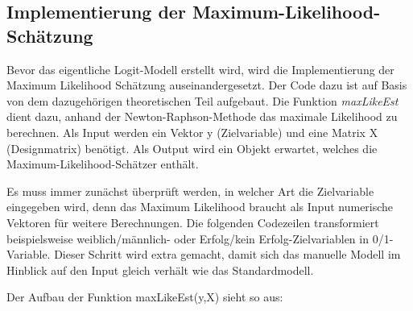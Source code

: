 \documentclass[12pt,]{article}
\newenvironment{Shaded}{\begin{snugshade}}{\end{snugshade}}
\newcommand{\KeywordTok}[1]{\textcolor[rgb]{0.13,0.29,0.53}{\textbf{#1}}}
\newcommand{\DataTypeTok}[1]{\textcolor[rgb]{0.13,0.29,0.53}{#1}}
\newcommand{\DecValTok}[1]{\textcolor[rgb]{0.00,0.00,0.81}{#1}}
\newcommand{\StringTok}[1]{\textcolor[rgb]{0.31,0.60,0.02}{#1}}
\newcommand{\CommentTok}[1]{\textcolor[rgb]{0.56,0.35,0.01}{\textit{#1}}}
\newcommand{\ControlFlowTok}[1]{\textcolor[rgb]{0.13,0.29,0.53}{\textbf{#1}}}
\newcommand{\OperatorTok}[1]{\textcolor[rgb]{0.81,0.36,0.00}{\textbf{#1}}}
\newcommand{\NormalTok}[1]{#1}
\begin{document}
\subsection{Implementierung der
Maximum-Likelihood-Schätzung}\label{implementierung-der-maximum-likelihood-schatzung}

Bevor das eigentliche Logit-Modell erstellt wird, wird die
Implementierung der Maximum Likelihood Schätzung auseinandergesetzt. Der
Code dazu ist auf Basis von dem dazugehörigen theoretischen Teil
aufgebaut. Die Funktion \emph{maxLikeEst} dient dazu, anhand der
Newton-Raphson-Methode das maximale Likelihood zu berechnen. Als Input
werden ein Vektor y (Zielvariable) und eine Matrix X (Designmatrix)
benötigt. Als Output wird ein Objekt erwartet, welches die
Maximum-Likelihood-Schätzer enthält.

Es muss immer zunächst überprüft werden, in welcher Art die Zielvariable
eingegeben wird, denn das Maximum Likelihood braucht als Input
numerische Vektoren für weitere Berechnungen. Die folgenden Codezeilen
transformiert beispielsweise weiblich/männlich- oder Erfolg/kein
Erfolg-Zielvariablen in 0/1-Variable. Dieser Schritt wird extra gemacht,
damit sich das manuelle Modell im Hinblick auf den Input gleich verhält
wie das Standardmodell.

\begin{Shaded}
\end{Shaded}

Der Aufbau der Funktion maxLikeEst(y,X) sieht so aus:

\begin{Shaded}
\end{Shaded}
\end{document}
